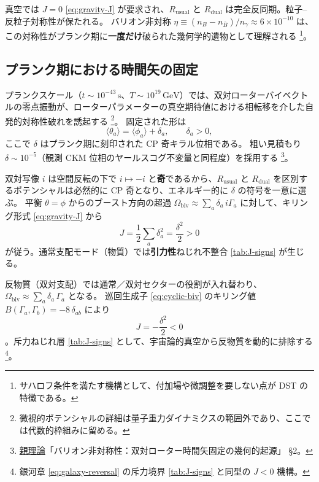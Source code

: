 \documentclass[dvipdfmx,a4paper,oneside]{jsbook}
\numberwithin{equation}{chapter}
\begin{document}
真空では \(J = 0\) \eqref{eq:gravity-J} が要求され、\(R_{\mathrm{usual}}\) と \(R_{\mathrm{dual}}\) は完全反同期。粒子--反粒子対称性が保たれる。
バリオン非対称 \(\eta \equiv (n_B - n_{\bar{B}})/n_\gamma \approx 6 \times 10^{-10}\) は、この対称性がプランク期に\textbf{一度だけ}破られた幾何学的遺物として理解される \footnote{サハロフ条件を満たす機構として、付加場や微調整を要しない点が DST の特徴である。}。

\subsection{プランク期における時間矢の固定}

プランクスケール（\(t \sim 10^{-43}\,\mathrm{s}\)、\(T \sim 10^{19}\,\mathrm{GeV}\)）では、双対ローターバイベクトルの零点振動が、ローターパラメーターの真空期待値における相転移を介した自発的対称性破れを誘起する \footnote{微視的ポテンシャルの詳細は量子重力ダイナミクスの範囲外であり、ここでは代数的枠組みに留める。}。
固定された形は
\begin{equation}
  \langle \theta_a \rangle = \langle \phi_a \rangle + \delta_a,
  \qquad \delta_a > 0,
  \label{eq:cosmo-theta-vev}
\end{equation}
ここで \(\delta\) はプランク期に刻印された CP 奇キラル位相である。
粗い見積もり \(\delta \sim 10^{-5}\)（観測 CKM 位相のヤールスコグ不変量と同程度）を採用する \footnote{\hyperref[sec:sister-manuscripts]{親理論}「バリオン非対称性：双対ローター時間矢固定の幾何的起源」 §2。}。

双対写像 \(i\) は空間反転の下で \(i \mapsto -i\) と\textbf{奇}であるから、\(R_{\mathrm{usual}}\) と \(R_{\mathrm{dual}}\) を区別するポテンシャルは必然的に CP 奇となり、エネルギー的に \(\delta\) の符号を一意に選ぶ。
平衡 \(\theta = \phi\) からのブースト方向の超過 \(\Omega_{\mathrm{biv}} \approx \sum_a \delta_a\, i\Gamma_a\) に対して、キリング形式 \eqref{eq:gravity-J} から
\begin{equation}
  J = \frac{1}{2} \sum_a \delta_a^2 = \frac{\delta^2}{2} > 0
  \label{eq:cosmo-J-matter}
\end{equation}
が従う。通常支配モード（物質）では\textbf{引力性}ねじれ不整合 \eqref{tab:J-signs} が生じる。

反物質（双対支配）では通常／双対セクターの役割が入れ替わり、\(\Omega_{\mathrm{biv}} \approx \sum_a \delta_a\, \Gamma_a\) となる。
巡回生成子 \eqref{eq:cyclic-biv} のキリング値 \(B(\Gamma_a, \Gamma_b) = -8\,\delta_{ab}\) により
\begin{equation}
  J = -\frac{\delta^2}{2} < 0
  \label{eq:cosmo-J-antimatter}
\end{equation}
。斥力ねじれ層 \eqref{tab:J-signs} として、宇宙論的真空から反物質を動的に排除する \footnote{銀河章 \eqref{eq:galaxy-reversal} の斥力境界 \eqref{tab:J-signs} と同型の \(J < 0\) 機構。}。
\end{document}
